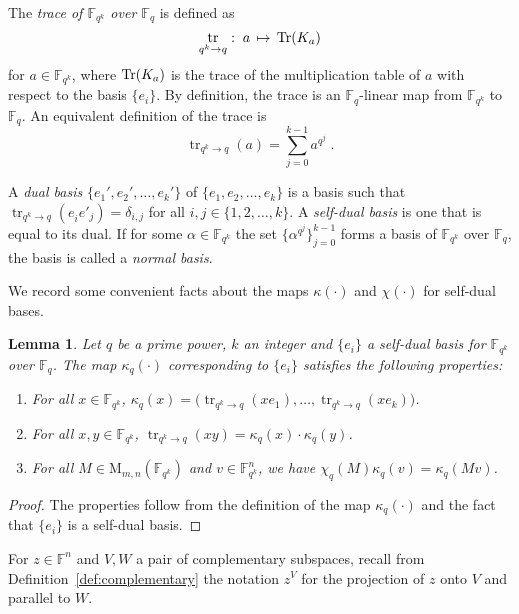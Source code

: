 \documentclass[11pt]{article}
\newtheorem{lemma}[theorem]{Lemma}
\theoremstyle{definition}
\newcommand{\Tr}{\mbox{\rm Tr}}
\newcommand{\F}{\ensuremath{\mathbb{F}}}
\newcommand{\Fq}{\F_q}
\newcommand{\downsize}{\kappa}
\newcommand{\downsizem}{\chi}
\DeclareMathOperator{\tr}{tr}
\newcommand{\Matrix}{\mathrm{M}}
\begin{document}
The \emph{trace of\/ $\F_{q^k}$ over\/ $\Fq$} is defined as
\begin{equation}\label{eq:def-trace}
  \tr_{q^k \to q} :\; a \,\mapsto \, \Tr(K_a)
\end{equation}
for $a \in \F_{q^k}$, where $\Tr(K_a)$ is the trace of the multiplication table
of $a$ with respect to the basis $\{e_i\}$.
By definition, the trace is an $\Fq$-linear map from $\F_{q^k}$ to $\Fq$.
An equivalent definition of the trace is
\[
	\tr_{q^k \to q}(a) = \sum_{j = 0}^{k-1} a^{q^j}\;.
\]

A \emph{dual basis} $\{e_1', e_2', \ldots, e_k' \}$ of $\{e_1, e_2, \ldots,
e_k\}$ is a basis such that $\tr_{q^k \to q}(e^{}_i e'_j) = \delta_{i,j}$ for
all $i, j \in \{1, 2, \ldots, k\}$.
A \emph{self-dual basis} is one that is equal to its dual.
If for some $\alpha \in \F_{q^k}$ the set $\{ \alpha^{q^j} \}_{j=0}^{k-1}$ forms a
basis of $\F_{q^k}$ over $\Fq$, the basis is called a \emph{normal basis}.

We record some convenient facts about the maps $\downsize(\cdot)$ and
$\downsizem(\cdot)$ for self-dual bases.

\begin{lemma}
  \label{lem:downsize_field}
  Let $q$ be a prime power, $k$ an integer and $\{e_i\}$ a self-dual basis for
  $\F_{q^k}$ over $\F_q$.
  The map $\downsize_q(\cdot)$ corresponding to $\{e_i\}$ satisfies the
  following properties:
  \begin{enumerate}
  \item For all $x \in \F_{q^k}$, $\downsize_q(x) = \bigl( \tr_{q^k \to
      q}(xe_1),\ldots,\tr_{q^k \to q}(xe_k) \bigr)$.
  \item For all $x,y \in \F_{q^k}$, $\tr_{q^k \to q}(xy) = \downsize_q(x) \cdot
    \downsize_q(y)$.
  \item For all $M \in \Matrix_{m, n}(\F_{q^k})$ and $v \in
    \F_{q^k}^n$, we have $\downsizem_q(M) \downsize_q(v) = \downsize_q(Mv)$.
  \end{enumerate}
\end{lemma}
 
\begin{proof}
  The properties follow from the definition of the map
  $\downsize_q(\cdot)$ and the fact that $\{e_i\}$ is a self-dual basis.
\end{proof}

For $z\in \F^n$ and $V,W$ a pair of complementary subspaces, recall from
Definition~\ref{def:complementary} the notation $z^V$ for the projection of $z$
onto $V$ and parallel to $W$.
\end{document}
